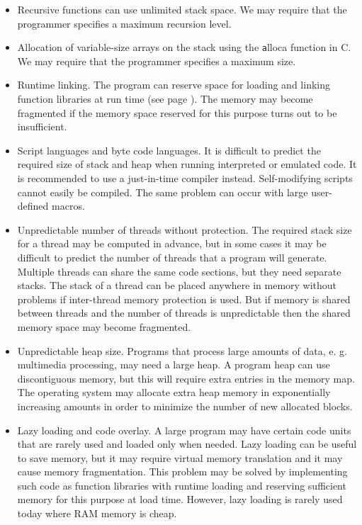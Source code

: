 \documentclass[forwardcom.tex]{subfiles}
\begin{document}
\begin{itemize}
\item Recursive functions can use unlimited stack space. We may require that the programmer specifies a maximum recursion level.

\item Allocation of variable-size arrays on the stack using the {\texttt alloca} function in C. We may require that the programmer specifies a maximum size. 

\item Runtime linking. The program can reserve space for loading and linking function libraries at run time (see page \pageref{runtimeLinking}). The memory may become fragmented if the memory space reserved for this purpose turns out to be insufficient.

\item Script languages and byte code languages. It is difficult to predict the required size of stack and heap when running interpreted or emulated code. It is recommended to use a just-in-time compiler instead. Self-modifying scripts cannot easily be compiled. The same problem can occur with large user-defined macros.

\item Unpredictable number of threads without protection. The required stack size for a thread may be computed in advance, but in some cases it may be difficult to predict the number of threads that a program will generate. Multiple threads can share the same code sections, but they need separate stacks. The stack of a thread can be placed anywhere in memory without problems if inter-thread memory protection is used. But if memory is shared between threads and the number of threads is unpredictable then the shared 
memory space may become fragmented. 

\item Unpredictable heap size. Programs that process large amounts of data, e. g. multimedia processing, may need a large heap. A program heap can use discontiguous memory, but this will require extra entries in the memory map. The operating system may allocate extra heap memory in exponentially increasing amounts in order to minimize the number of new allocated blocks.

\item Lazy loading and code overlay. A large program may have certain code units that are rarely used and loaded only when needed. Lazy loading can be useful to save memory, but it may require virtual memory translation and it may cause memory fragmentation. This problem may be solved by implementing such code as function libraries with runtime loading and reserving sufficient memory for this purpose at load time. However, lazy loading is rarely used today where RAM memory is cheap.


\end{itemize}
\end{document}
